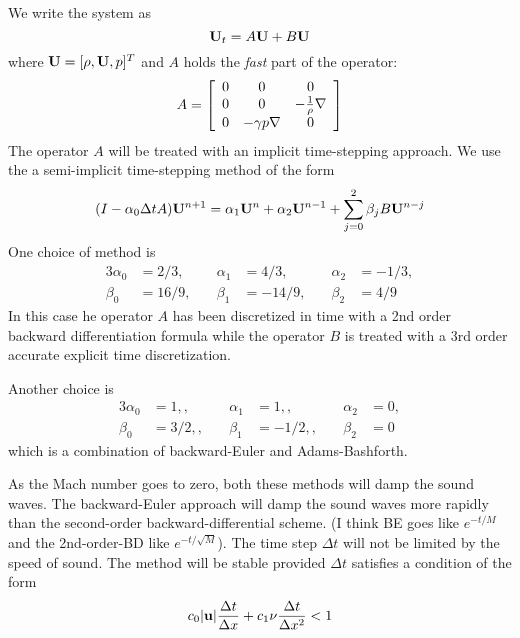 \documentclass[10pt]{article}
\begin{document}
We write the system as
\[
   {\bf U}_t = A {\bf U} + B {\bf U} 
\]
where ${\bf U}=[\rho, {\bf U}, p]^T$ and  $A$ holds the {\sl fast} part of the operator:
\[
  A = \left[ \begin{array}{ccc}
                0 & 0 & 0 \\
                0 & 0 & -{1\over\rho} \nabla  \\
                0 &  -\gamma p \nabla  & 0 
             \end{array} \right]
\]
The operator $A$ will be treated with an implicit time-stepping approach.  
We use the a semi-implicit time-stepping method of the form
\begin{equation}
(I - \alpha_0 {\Delta t} A) {\bf U}^{n+1} = \alpha_1 {\bf U}^n + \alpha_2{\bf U}^{n-1}
                  + \sum_{j=0}^2 \beta_j B {\bf U}^{n-j}  \label{eq:ts}
\end{equation}
One choice of method is
\begin{alignat*}{3}
 \alpha_0 &=2/3, &\quad \alpha_1&=4/3,  &\quad \alpha_2&=-1/3, \\
 \beta_0&=16/9,  &\quad \beta_1&=-14/9, &\quad  \beta_2&=4/9 
\end{alignat*}
In this case he operator $A$ has been discretized in time with a 2nd order backward differentiation 
formula while the
operator $B$ is treated with a 3rd order accurate explicit time discretization. 

Another choice is
\begin{alignat*}{3}
 \alpha_0 &=1, , &\quad \alpha_1 &=1, , &\quad \alpha_2&=0, \\
 \beta_0 &=3/2,, &\quad  \beta_1 &=-1/2, , &\quad \beta_2&=0
\end{alignat*}
which is a combination of backward-Euler and Adams-Bashforth.

As the Mach number goes to zero, both these  methods will damp the sound waves. The
backward-Euler approach will damp the sound waves more rapidly than the second-order
backward-differential scheme. (I think BE goes like $e^{-t/M}$ and the 2nd-order-BD like
$e^{-t/\sqrt{M}}$).
The time step $\Delta t$ will not be limited by the speed of sound.
The method will be stable provided $\Delta t$ satisfies a condition of the form
\[
           c_0 |{\bf u}| {\Delta t\over \Delta x} + c_1 \nu {\Delta t \over \Delta x ^2} < 1
\]
\end{document}
